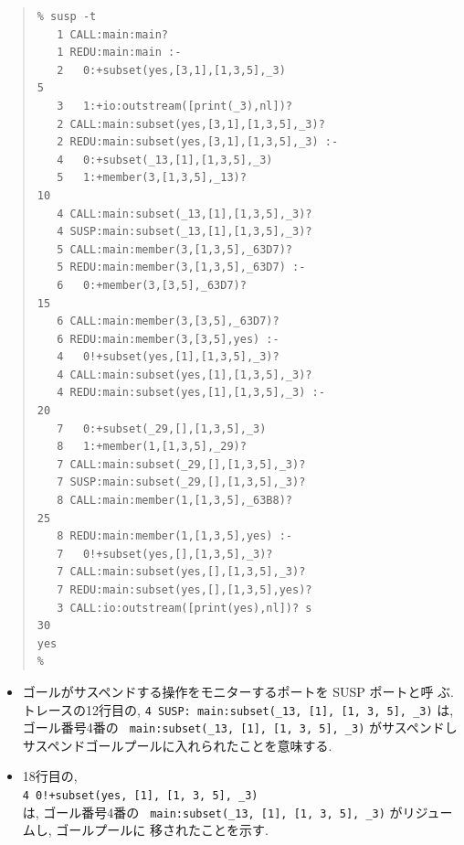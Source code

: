 \documentclass[a4,titlepage]{jsreport}
\begin{document}
\begin{quote}
\begin{Verbatim}[frame=single,baselinestretch=0.8]
% klic -o susp susp.kl1                                                1
% susp -t
   1 CALL:main:main? 
   1 REDU:main:main :-
   2   0:+subset(yes,[3,1],[1,3,5],_3)                                 5
   3   1:+io:outstream([print(_3),nl])? 
   2 CALL:main:subset(yes,[3,1],[1,3,5],_3)? 
   2 REDU:main:subset(yes,[3,1],[1,3,5],_3) :-
   4   0:+subset(_13,[1],[1,3,5],_3)
   5   1:+member(3,[1,3,5],_13)?                                      10
   4 CALL:main:subset(_13,[1],[1,3,5],_3)? 
   4 SUSP:main:subset(_13,[1],[1,3,5],_3)? 
   5 CALL:main:member(3,[1,3,5],_63D7)? 
   5 REDU:main:member(3,[1,3,5],_63D7) :-
   6   0:+member(3,[3,5],_63D7)?                                      15
   6 CALL:main:member(3,[3,5],_63D7)? 
   6 REDU:main:member(3,[3,5],yes) :-
   4   0!+subset(yes,[1],[1,3,5],_3)? 
   4 CALL:main:subset(yes,[1],[1,3,5],_3)? 
   4 REDU:main:subset(yes,[1],[1,3,5],_3) :-                          20
   7   0:+subset(_29,[],[1,3,5],_3)
   8   1:+member(1,[1,3,5],_29)? 
   7 CALL:main:subset(_29,[],[1,3,5],_3)? 
   7 SUSP:main:subset(_29,[],[1,3,5],_3)? 
   8 CALL:main:member(1,[1,3,5],_63B8)?                               25
   8 REDU:main:member(1,[1,3,5],yes) :-
   7   0!+subset(yes,[],[1,3,5],_3)? 
   7 CALL:main:subset(yes,[],[1,3,5],_3)? 
   7 REDU:main:subset(yes,[],[1,3,5],yes)? 
   3 CALL:io:outstream([print(yes),nl])? s                            30
yes
%
\end{Verbatim}
\end{quote}

\begin{itemize}\parskip=0mm\baselineskip
\item ゴールがサスペンドする操作をモニターするポートを SUSP ポートと呼
ぶ.  トレースの12行目の, {\tt 4 SUSP: main:\linebreak[1]subset(\_13,
[1], [1, 3, 5], \_3)} は, ゴール番号4番の {\tt
main:\linebreak[1]subset(\_13, [1], [1, 3, 5], \_3)} がサスペンドし
サスペンドゴールプールに入れられたことを意味する.
\item 18行目の, \\
{\tt 4 0!+subset(yes, [1], [1, 3, 5], \_3)}\\は, ゴール番号4番の {\tt
main:subset(\_13, [1], [1, 3, 5], \_3)} がリジュームし, ゴールプールに
移されたことを示す.

\end{itemize}
\end{document}
